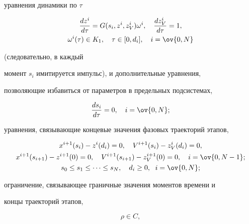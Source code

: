 уравнения динамики по $\tau$


\begin{gather*}


\frac{dz^i}{d\tau}=G(s_i,z^i,z_V^i)\omega^i,\quad


\frac{dz_V^i}{d\tau}=1, \\


\omega^i(\tau)\in K_1,\quad\tau\in [0,d_i],\quad i=\ov{0,N}




\end{gather*}


(следовательно, в каждый


момент $s_i$ имитируется импульс), и дополнительные уравнения,


позволяющие избавиться от параметров в предельных подсистемах,


$$


\frac{ds_i}{d\tau}=0,\quad i=\ov{0,N};


$$





уравнения, связывающие концевые значения фазовых траекторий этапов,


\begin{gather}


x^{i+1}(s_i)-z^i(d_i)=0, \quad V^{i+1}(s_i)-z_V^i(d_i)=0,\notag \\


x^{i+1}(s_{i+1})-z^{i+1}(0)=0, \quad V^{i+1}(s_{i+1})-z_V^{i+1}(0)=0,


\quad i=\ov{0,N-1}; \label{eq:(5.63)} \\


s_0\leq s_1\leq \dotsb\leq s_N, \quad d_i\geq 0,\ \;


i=\ov{0,N}; \label{eq:(5.64)}


\end{gather}





ограничение, связывающее граничные значения моментов времени и


концы траекторий этапов,


\begin{equation}


\rho\in


C,\label{eq:(5.65)}


\end{equation}


